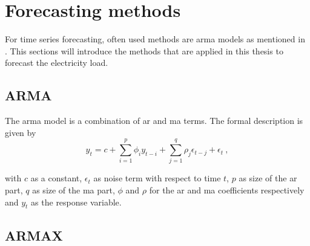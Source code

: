 \section{Forecasting methods}
\label{sec:forecastmet}

For time series forecasting, often used methods are \eg \gls{arma} models as mentioned in . This sections will introduce the methods that are applied in this thesis to forecast the electricity load.\\%

\subsection*{ARMA}

The \gls{arma} model is a combination of \acrfull{ar} and \gls{ma} terms. The formal description is given by\\

\begin{equation}
y_t = c+\sum_{i=1}^{p}\phi_iy_{t-i}+\sum_{j=1}^{q}\rho_j\epsilon_{t-j}+\epsilon_t~,
\label{eq:arma}
\end{equation}

with $c$ as a constant, $\epsilon_t$ as noise term with respect to time $t$, $p$ as size of the \gls{ar} part, $q$ as size of the \gls{ma} part, $\phi$ and $\rho$ for the \gls{ar} and \gls{ma} coefficients respectively and $y_t$ as the response variable.\\

\subsection*{ARMAX}

